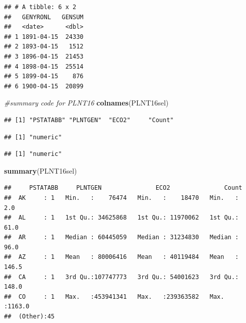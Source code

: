 \documentclass[12pt,]{article}
\newenvironment{Shaded}{\begin{snugshade}}{\end{snugshade}}
\newcommand{\KeywordTok}[1]{\textcolor[rgb]{0.13,0.29,0.53}{\textbf{#1}}}
\newcommand{\CommentTok}[1]{\textcolor[rgb]{0.56,0.35,0.01}{\textit{#1}}}
\newcommand{\OperatorTok}[1]{\textcolor[rgb]{0.81,0.36,0.00}{\textbf{#1}}}
\newcommand{\NormalTok}[1]{#1}
\begin{document}
\begin{verbatim}
## # A tibble: 6 x 2
##   GENYRONL   GENSUM
##   <date>      <dbl>
## 1 1891-04-15  24330
## 2 1893-04-15   1512
## 3 1896-04-15  21453
## 4 1898-04-15  25514
## 5 1899-04-15    876
## 6 1900-04-15  20899
\end{verbatim}

\begin{Shaded}
\begin{Highlighting}[]
\CommentTok{#summary code for PLNT16}
\KeywordTok{colnames}\NormalTok{(PLNT16sel)}
\end{Highlighting}
\end{Shaded}

\begin{verbatim}
## [1] "PSTATABB" "PLNTGEN"  "ECO2"     "Count"
\end{verbatim}

\begin{Shaded}
\end{Shaded}

\begin{verbatim}
## [1] "numeric"
\end{verbatim}

\begin{Shaded}
\end{Shaded}

\begin{verbatim}
## [1] "numeric"
\end{verbatim}

\begin{Shaded}
\begin{Highlighting}[]
\KeywordTok{summary}\NormalTok{(PLNT16sel)}
\end{Highlighting}
\end{Shaded}

\begin{verbatim}
##     PSTATABB     PLNTGEN               ECO2               Count       
##  AK     : 1   Min.   :    76474   Min.   :    18470   Min.   :   2.0  
##  AL     : 1   1st Qu.: 34625868   1st Qu.: 11970062   1st Qu.:  61.0  
##  AR     : 1   Median : 60445059   Median : 31234830   Median :  96.0  
##  AZ     : 1   Mean   : 80006416   Mean   : 40119484   Mean   : 146.5  
##  CA     : 1   3rd Qu.:107747773   3rd Qu.: 54001623   3rd Qu.: 148.0  
##  CO     : 1   Max.   :453941341   Max.   :239363582   Max.   :1163.0  
##  (Other):45
\end{verbatim}
\end{document}
